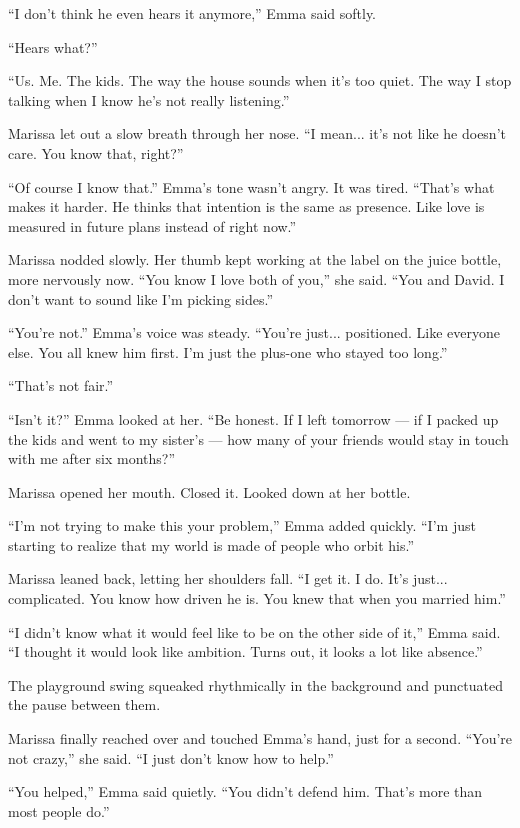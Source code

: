 ``I don’t think he even hears it anymore,'' Emma said softly.

``Hears what?''

``Us. Me. The kids. The way the house sounds when it’s too quiet. The way I stop talking when I know 
he’s not really listening.''

Marissa let out a slow breath through her nose. ``I mean... it’s not like he doesn’t care. You know that, 
right?''

``Of course I know that.'' Emma’s tone wasn’t angry. It was tired. ``That’s what makes it harder. He 
thinks that intention is the same as presence. Like love is measured in future plans instead of right 
now.''

Marissa nodded slowly. Her thumb kept working at the label on the juice bottle, more nervously now. 
``You know I love both of you,'' she said. ``You and David. I don’t want to sound like I’m picking 
sides.''

``You’re not.'' Emma’s voice was steady. ``You’re just... positioned. Like everyone else. You all knew 
him first. I’m just the plus-one who stayed too long.''

``That’s not fair.''

``Isn’t it?'' Emma looked at her. ``Be honest. If I left tomorrow — if I packed up the kids and went to 
my sister’s — how many of your friends would stay in touch with me after six months?''

Marissa opened her mouth. Closed it. Looked down at her bottle.

``I’m not trying to make this your problem,'' Emma added quickly. ``I’m just starting to realize that my 
world is made of people who orbit his.''

Marissa leaned back, letting her shoulders fall. ``I get it. I do. It’s just... complicated. You know how 
driven he is. You knew that when you married him.''

``I didn’t know what it would feel like to be on the other side of it,'' Emma said. ``I thought it would 
look like ambition. Turns out, it looks a lot like absence.''

The playground swing squeaked rhythmically in the background and punctuated the pause between them.

Marissa finally reached over and touched Emma’s hand, just for a second. ``You’re not crazy,'' she said. 
``I just don’t know how to help.''

``You helped,'' Emma said quietly. ``You didn’t defend him. That’s more than most people do.''

